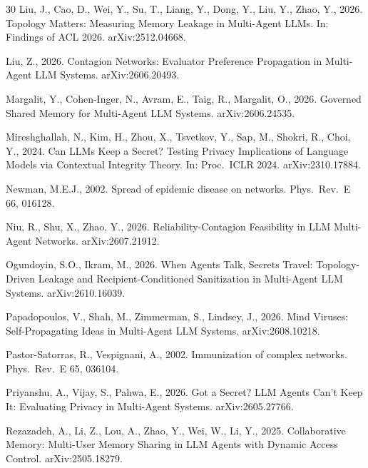 \documentclass{article}
\begin{document}
\begin{thebibliography}{30}
Liu, J., Cao, D., Wei, Y., Su, T., Liang, Y., Dong, Y., Liu, Y., Zhao, Y., 2026. Topology Matters: Measuring Memory Leakage in Multi-Agent LLMs. In: Findings of ACL 2026. arXiv:2512.04668.

Liu, Z., 2026. Contagion Networks: Evaluator Preference Propagation in Multi-Agent LLM Systems. arXiv:2606.20493.

Margalit, Y., Cohen-Inger, N., Avram, E., Taig, R., Margalit, O., 2026. Governed Shared Memory for Multi-Agent LLM Systems. arXiv:2606.24535.

Mireshghallah, N., Kim, H., Zhou, X., Tsvetkov, Y., Sap, M., Shokri, R., Choi, Y., 2024. Can LLMs Keep a Secret? Testing Privacy Implications of Language Models via Contextual Integrity Theory. In: Proc.\ ICLR 2024. arXiv:2310.17884.

Newman, M.E.J., 2002. Spread of epidemic disease on networks. Phys.\ Rev.\ E 66, 016128.

Niu, R., Shu, X., Zhao, Y., 2026. Reliability-Contagion Feasibility in LLM Multi-Agent Networks. arXiv:2607.21912.

Ogundoyin, S.O., Ikram, M., 2026. When Agents Talk, Secrets Travel: Topology-Driven Leakage and Recipient-Conditioned Sanitization in Multi-Agent LLM Systems. arXiv:2610.16039.

Papadopoulos, V., Shah, M., Zimmerman, S., Lindsey, J., 2026. Mind Viruses: Self-Propagating Ideas in Multi-Agent LLM Systems. arXiv:2608.10218.

Pastor-Satorras, R., Vespignani, A., 2002. Immunization of complex networks. Phys.\ Rev.\ E 65, 036104.

Priyanshu, A., Vijay, S., Pahwa, E., 2026. Got a Secret? LLM Agents Can't Keep It: Evaluating Privacy in Multi-Agent Systems. arXiv:2605.27766.

Rezazadeh, A., Li, Z., Lou, A., Zhao, Y., Wei, W., Li, Y., 2025. Collaborative Memory: Multi-User Memory Sharing in LLM Agents with Dynamic Access Control. arXiv:2505.18279.


\end{thebibliography}
\end{document}
